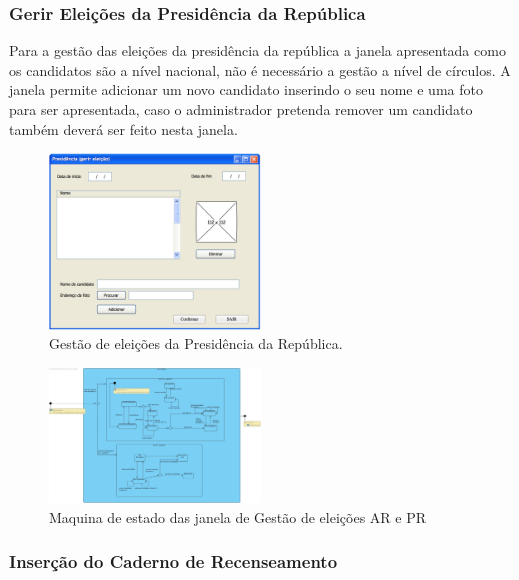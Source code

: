 \documentclass[a4paper,12pt]{report}
\begin{document}
\subsubsection{Gerir Eleições da Presidência da República}
Para a gestão das eleições da presidência da república a janela apresentada como os candidatos são a nível nacional, não é necessário a gestão a nível de círculos. A janela permite adicionar um novo candidato inserindo o seu nome e uma foto para ser apresentada, caso o administrador pretenda remover um candidato também deverá ser feito nesta janela.
\begin{figure}[h]
\begin{center}
	\includegraphics[width=0.5\textwidth]{media/mockup/PRGerir.png}
	 \caption{Gestão de eleições da Presidência da República.}
\end{center}
\end{figure}

\begin{figure}[h]
\begin{center}
	\includegraphics[width=0.5\textwidth]{media/MaqEst/m_GerirEleicao.jpg}
	 \caption{Maquina de estado das janela de Gestão de eleições AR e PR}
\end{center}
\end{figure}

\newpage
\subsubsection{Inserção do Caderno de Recenseamento}
\end{document}
